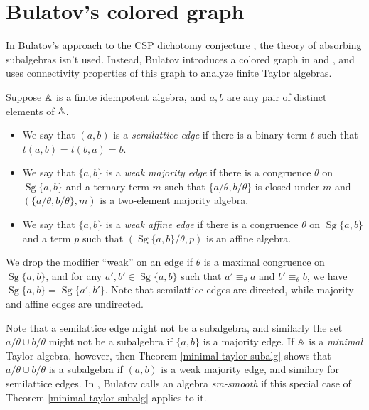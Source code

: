 \documentclass[letterpaper,11pt]{article}
\DeclareMathOperator{\Sg}{Sg}
\begin{document}


\section{Bulatov's colored graph}

In Bulatov's approach to the CSP dichotomy conjecture \cite{bulatov-dichotomy}, the theory of absorbing subalgebras isn't used. Instead, Bulatov introduces a colored graph in \cite{colored-graph-prelim} and \cite{colored-graph}, and uses connectivity properties of this graph to analyze finite Taylor algebras.

\begin{defn} Suppose $\mathbb{A}$ is a finite idempotent algebra, and $a, b$ are any pair of distinct elements of $\mathbb{A}$.
\begin{itemize}
\item We say that $(a,b)$ is a \emph{semilattice edge} if there is a binary term $t$ such that $t(a,b) = t(b,a) = b$.
\item We say that $\{a,b\}$ is a \emph{weak majority edge} if there is a congruence $\theta$ on $\Sg\{a,b\}$ and a ternary term $m$ such that $\{a/\theta,b/\theta\}$ is closed under $m$ and $(\{a/\theta,b/\theta\},m)$ is a two-element majority algebra.
\item We say that $\{a,b\}$ is a \emph{weak affine edge} if there is a congruence $\theta$ on $\Sg\{a,b\}$ and a term $p$ such that $(\Sg\{a,b\}/\theta, p)$ is an affine algebra.
\end{itemize}
We drop the modifier ``weak'' on an edge if $\theta$ is a maximal congruence on $\Sg\{a,b\}$, and for any $a', b' \in \Sg\{a,b\}$ such that $a' \equiv_\theta a$ and $b' \equiv_\theta b$, we have $\Sg\{a,b\} = \Sg\{a',b'\}$. Note that semilattice edges are directed, while majority and affine edges are undirected.
\end{defn}

Note that a semilattice edge might not be a subalgebra, and similarly the set $a/\theta \cup b/\theta$ might not be a subalgebra if $\{a,b\}$ is a majority edge. If $\mathbb{A}$ is a \emph{minimal} Taylor algebra, however, then Theorem \ref{minimal-taylor-subalg} shows that $a/\theta \cup b/\theta$ is a subalgebra if $(a,b)$ is a weak majority edge, and similary for semilattice edges. In \cite{bulatov-dichotomy}, Bulatov calls an algebra \emph{sm-smooth} if this special case of Theorem \ref{minimal-taylor-subalg} applies to it.
\end{document}
